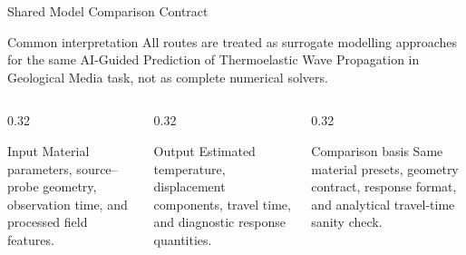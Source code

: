 \documentclass[aspectratio=169,10pt]{beamer}
\begin{document}
\begin{frame}{Shared Model Comparison Contract}
  \begin{block}{Common interpretation}
    All routes are treated as surrogate modelling approaches for the same
    AI-Guided Prediction of Thermoelastic Wave Propagation in Geological Media
    task, not as complete numerical solvers.
  \end{block}
  \begin{columns}[T]
    \begin{column}{0.32\textwidth}
      \begin{block}{Input}
        \footnotesize
        Material parameters, source--probe geometry, observation time, and
        processed field features.
      \end{block}
    \end{column}
    \begin{column}{0.32\textwidth}
      \begin{block}{Output}
        \footnotesize
        Estimated temperature, displacement components, travel time, and
        diagnostic response quantities.
      \end{block}
    \end{column}
    \begin{column}{0.32\textwidth}
      \begin{block}{Comparison basis}
        \footnotesize
        Same material presets, geometry contract, response format, and
        analytical travel-time sanity check.
      \end{block}
    \end{column}
  \end{columns}
\end{frame}
\end{document}
